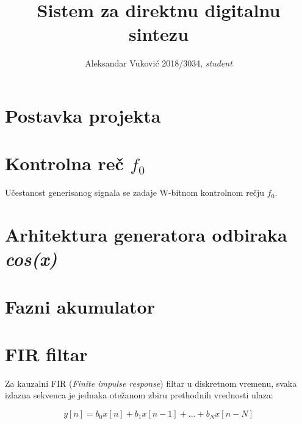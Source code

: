 \documentclass[journal,twocolumn,letterpaper]{IEEEJERM}
\begin{document}
\title{Sistem za direktnu digitalnu sintezu}

\author{Aleksandar Vuković 2018/3034, \textit{student}}

{}


\IEEEpeerreviewmaketitle



\section{Postavka projekta}


\section{Kontrolna reč $f_0$}
Učestanost generisanog signala se zadaje W-bitnom kontrolnom rečju $f_0$.



\section{Arhitektura generatora odbiraka \textit{cos(x)}}



\section{Fazni akumulator}


\section{FIR filtar}

Za kauzalni FIR (\textit{Finite impulse response}) filtar u diskretnom vremenu, svaka izlazna sekvenca je jednaka otežanom zbiru prethodnih vrednosti ulaza:

\begin{equation}
y[n] = b_0 x[n] + b_1 x[n-1] + ... + b_N x[n-N]
\end{equation}
\end{document}
